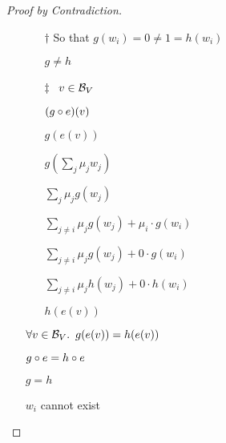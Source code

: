 \begin{lemma}
\begin{proof}[Proof by Contradiction]
\begin{itemize}
      \item[\phs]
        \begin{itemize}
          \item[$\dagger$]
            So that $g(w_i) = 0 \neq 1 = h(w_i)$
          \item[\imps] $g \neq h$
        \end{itemize}

      \item[\phs]
        \begin{itemize}
          \item[$\ddagger$]
            \Let~$v\in\mathcal{B}_{V}$
            \marginnote{\Hyp}

          \item[\phs] $(g\circ e)(v)$

          \item[\eqs] $g(e(v))$
            \marginnote{\Def-$\compose$}

          \item[\eqs]
            $g(\sum_j\mu_jw_j)$

          \item[\eqs]
            $\sum_j\mu_jg(w_j)$

          \item[\eqs]
            $\sum_{j\neq i}\mu_jg(w_j) + \mu_i\cdot g(w_i)$

          \item[\eqs]
            $\sum_{j\neq i}\mu_jg(w_j) + 0\cdot g(w_i)$
            \marginnote{$\forall$-\Elim-$\star$}

          \item[\eqs]
            $\sum_{j\neq i}\mu_jh(w_j) + 0\cdot h(w_i)$

          \item[\eqs]
            $h(e(v))$
        \end{itemize}

        \item[\imps]
          $\forall v\in\mathcal{B}_{V}\ldotp~g(e(v))=h(e(v))$
          \marginnote{$\forall$-\Intro-$\ddagger$}

        \item[\imps]
          $g\circ e = h\circ e$
          \marginnote{\Def-$=$}

        \item[\imps]
          $g = h$

        \item[\contras]
          $w_i$ cannot exist
          \marginnote{\Contra-$\dagger$}
          \qedhere
    \end{itemize}
  \end{proof}
\end{lemma}

